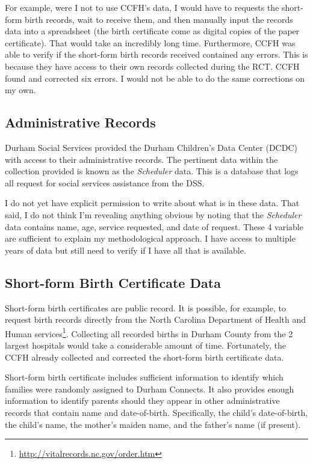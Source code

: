 \documentclass[12pt,letterpaperpaper,]{book}
\renewcommand{\href}[2]{#2\footnote{\url{#1}}}
\begin{document}
For example, were I not to use CCFH's data, I would have to requests the
short-form birth records, wait to receive them, and then manually input
the records data into a spreadsheet (the birth certificate come as
digital copies of the paper certificate). That would take an incredibly
long time. Furthermore, CCFH was able to verify if the short-form birth
records received contained any errors. This is because they have access
to their own records collected during the RCT. CCFH found and corrected
six errors. I would not be able to do the same corrections on my own.

\subsection*{Administrative Records}\label{administrative-records}

Durham Social Services provided the Durham Children's Data Center (DCDC)
with access to their administrative records. The pertinent data within
the collection provided is known as the \emph{Scheduler} data. This is a
database that logs all request for social services assistance from the
DSS.

I do not yet have explicit permission to write about what is in these
data. That said, I do not think I'm revealing anything obvious by noting
that the \emph{Scheduler} data contains name, age, service requested,
and date of request. These 4 variable are sufficient to explain my
methodological approach. I have access to multiple years of data but
still need to verify if I have all that is available.

\subsection*{Short-form Birth Certificate
Data}\label{short-form-birth-certificate-data}

Short-form birth certificates are public record. It is possible, for
example, to request birth records directly from the
\href{http://vitalrecords.nc.gov/order.htm}{North Carolina Department of
Health and Human services}. Collecting all recorded births in Durham
County from the 2 largest hospitals would take a considerable amount of
time. Fortunately, the CCFH already collected and corrected the
short-form birth certificate data.

Short-form birth certificate includes sufficient information to identify
which families were randomly assigned to Durham Connects. It also
provides enough information to identify parents should they appear in
other administrative records that contain name and date-of-birth.
Specifically, the child's date-of-birth, the child's name, the mother's
maiden name, and the father's name (if present).
\end{document}
